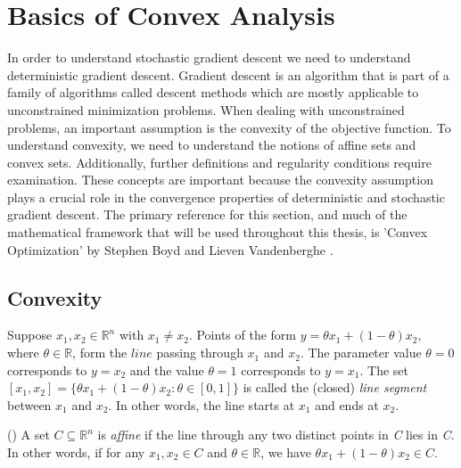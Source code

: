\section{Basics of Convex Analysis}
In order to understand stochastic gradient descent we need to understand deterministic gradient descent. Gradient descent is an algorithm that is part of a family of algorithms called descent methods which are mostly applicable to unconstrained minimization problems. When dealing with unconstrained problems, an important assumption is the convexity of the objective function. To understand convexity, we need to understand the notions of affine sets and convex sets. Additionally, further definitions and regularity conditions require examination. These concepts are important because the convexity assumption plays a crucial role in the convergence properties of deterministic and stochastic gradient descent. The primary reference for this section, and much of the mathematical framework that will be used throughout this thesis, is 'Convex Optimization' by Stephen Boyd and Lieven Vandenberghe \cite{boyd2004convex}.
\subsection{Convexity}
\begin{definition}
Suppose $x_{1},x_{2} \in \mathbb{R}^{n}$ with $x_{1} \neq x_{2}$. Points of the form $y = \theta x_{1} + (1-\theta) x_{2},$ where $\theta \in \mathbb{R}$, form the $\textit{line}$ passing through $x_{1}$ and $x_{2}$. The parameter value $\theta = 0$ corresponds to $y = x_{2}$ and the value $\theta = 1$ corresponds to $y = x_{1}$. The set $[x_{1},x_{2}] = \{\theta x_{1} + (1-\theta) x_{2}: \theta \in [0,1]\}$ is called the (closed) \textit{line segment} between $x_{1}$ and $x_{2}$. In other words, the line starts at $x_{1}$ and ends at $x_{2}.$
\end{definition}

\begin{definition}
(\cite[21]{boyd2004convex})
A set $C\subseteq\mathbb{R}^{n}$ is \textit{affine} if the line through any two distinct points in \textit{C} lies in \textit{C}. In other words, if for any $x_{1}, x_{2} \in C$ and $\theta \in \mathbb{R}$, we have $\theta x_{1} + (1-\theta) x_{2} \in C$.
\end{definition}


